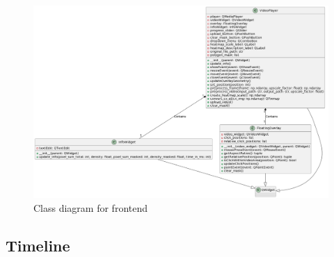 \documentclass[
]{article}
\begin{document}
\begin{figure}

{\centering \includegraphics[width=\textwidth,height=0.9\textheight]{../images/class-diagram-frontend-full.png}

}

\caption{\label{fig-frontend-class-diagram-full}Class diagram for
frontend}

\end{figure}

\newpage{}

\hypertarget{timeline}{%
\subsection*{Timeline}\label{timeline}}
\end{document}
